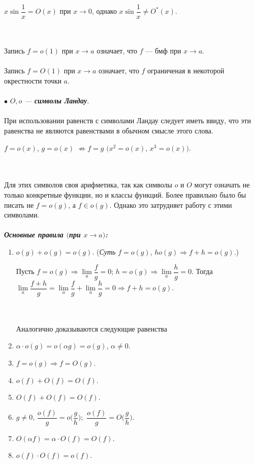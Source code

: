 \begin{example}
	$x\sin \dfrac{1}{x} = O(x)$ при $x\to 0$, однако $x\sin \dfrac{1}{x} \ne O^*(x)$.
\end{example}\\\\
Запись $f = o(1)$ при $x\to a$ означает, что $f$ --- бмф при $x\to a$.\\\\
Запись $f = O(1)$ при $x\to a$ означает, что $f$ ограниченая  в некоторой окрестности точки $a$.\\\\
$\bullet$ \textit{$O, o$ --- \textbf{символы Ландау}.}\\\\
При использовании равенств с символами Ландау следует иметь ввиду, что эти равенства не являются равенствами в обычном смысле этого слова.\\
\begin{example}
	$f = o(x)$, $g = o(x)$ $\not \Rightarrow f = g$ $(x^2 = o(x)$, $x^3 = o(x))$.  
\end{example}\\\\
Для этих символов своя арифметика, так как символы $o$ и $O$ могут означать не только конкретные функции, но и классы функций. Более правильно было бы писать не $f= o(g)$, а $f \in o(g)$. Однако это затрудняет работу с этими символами.\\\\
\textbf{\textit{Основные правила $($при $x \to a)$:}}
\begin{enumerate}
	\item $o(g) + o(g) = o(g).$ (\textit{Суть} $f = o(g)$, $h o (g)\Rightarrow f + h = o(g)$.)
	\begin{Proof}
		Пусть $f = o(g)\Rightarrow \lim\limits_{a}\dfrac{f}{g} = 0$; $h = o(g)\Rightarrow\lim\limits_{a}\dfrac{h}{g}=  0$.
		Тогда $\lim\limits_{a} \dfrac{f + h}{g} = \lim\limits_{a}\dfrac{f}{g} + \lim\limits_{a}\dfrac{h}{g} = 0\Rightarrow f+h = o(g)$.
	\end{Proof}\\\\
	Аналогично доказываются следующие равенства
	\item $\alpha \cdot o(g) = o (\alpha g) = o (g)$, $\alpha \ne 0$.
	\item $f = o(g)\Rightarrow f = O(g)$.
	\item $o(f) + O(f) = O(f)$.
	\item $O(f) + O(f) =  O(f)$.
	\item $g \ne 0$, $\dfrac{o(f)}{g} = o\Big(\dfrac{g}{h}\Big);$ $\dfrac{o(f)}{g} = O\Big(\dfrac{g}{h}\Big)$.
	\item $O(\alpha f) = \alpha\cdot  O(f) = O(f)$.
	\item $o(f) \cdot O(f) = o(f)$.
\end{enumerate}
